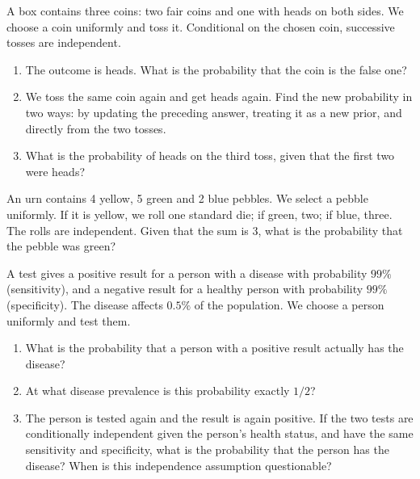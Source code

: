 \documentclass[11pt,a4paper]{article}
\newenvironment{enumeratea}{\begin{enumerate}[label=(\alph*),itemsep=0.28em,topsep=0.25em]}{\end{enumerate}}
\newcounter{problem}[section]
\begin{document}
\begin{problembook}
A box contains three coins: two fair coins and one with heads on both sides.
We choose a coin uniformly and toss it. Conditional on the chosen coin, successive tosses are independent.
\begin{enumeratea}
  \item The outcome is heads. What is the probability that the coin is the false one?
  \item We toss the same coin again and get heads again. Find the new probability
  in two ways: by updating the preceding answer, treating it as a new prior,
  and directly from the two tosses.
  \item What is the probability of heads on the third toss, given that the first two were heads?
\end{enumeratea}
\end{problembook}
\begin{problempencil}[Test 1, SE 2023]
An urn contains 4 yellow, 5 green and 2 blue pebbles. We select a pebble uniformly.
If it is yellow, we roll one standard die; if green, two; if blue, three.
The rolls are independent. Given that the sum is 3, what is the probability that the pebble was green?
\end{problempencil}
\begin{problembook}
A test gives a positive result for a person with a disease with probability $99\%$
(sensitivity), and a negative result for a healthy person with probability $99\%$
(specificity). The disease affects $0.5\%$ of the population. We choose a person uniformly and test them.
\begin{enumeratea}
  \item What is the probability that a person with a positive result actually has the disease?
  \item At what disease prevalence is this probability exactly $1/2$?
  \item The person is tested again and the result is again positive. If the two tests
  are conditionally independent given the person's health status, and have the same
  sensitivity and specificity, what is the probability that the person has the disease?
  When is this independence assumption questionable?
\end{enumeratea}
\end{problembook}
\end{document}
